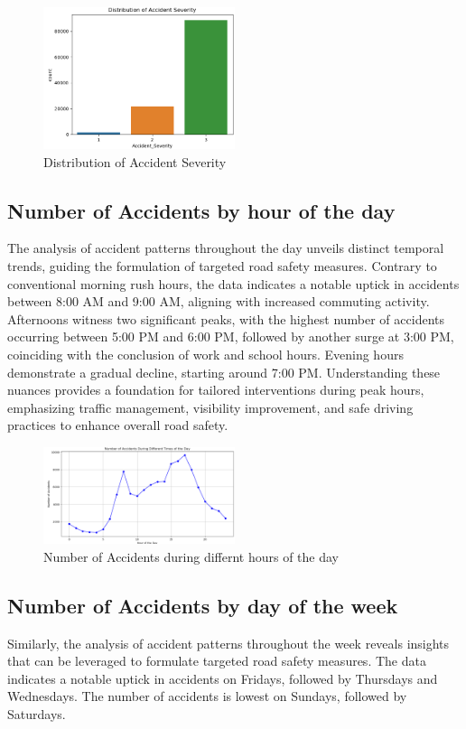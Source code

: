 \documentclass{article}
\begin{document}
\begin{figure}[ht]
  \centering
  \includegraphics[width=0.5\textwidth]{Images/accident_severity.png}
  \caption{Distribution of Accident Severity}
\end{figure}

\subsection{Number of Accidents by hour of the day}
The analysis of accident patterns throughout the day unveils distinct temporal trends, guiding the formulation of
targeted road safety measures. Contrary to conventional morning rush hours, the data indicates a notable uptick in
accidents between 8:00 AM and 9:00 AM, aligning with increased commuting activity. Afternoons witness two
significant peaks, with the highest number of accidents occurring between 5:00 PM and 6:00 PM, followed by
another surge at 3:00 PM, coinciding with the conclusion of work and school hours. Evening hours demonstrate
a gradual decline, starting around 7:00 PM. Understanding these nuances provides a foundation for tailored
interventions during peak hours, emphasizing traffic management, visibility improvement, and safe driving
practices to enhance overall road safety.

\begin{figure}[ht]
  \centering
  \includegraphics[width=0.5\textwidth]{Images/accidents_by_hour.png}
  \caption{Number of Accidents during differnt hours of the day}
\end{figure}

\subsection{Number of Accidents by day of the week}
Similarly, the analysis of accident patterns throughout the week reveals insights that can be leveraged to
formulate targeted road safety measures. The data indicates a notable uptick in accidents on Fridays, followed
by Thursdays and Wednesdays. The number of accidents is lowest on Sundays, followed by Saturdays.
\end{document}
